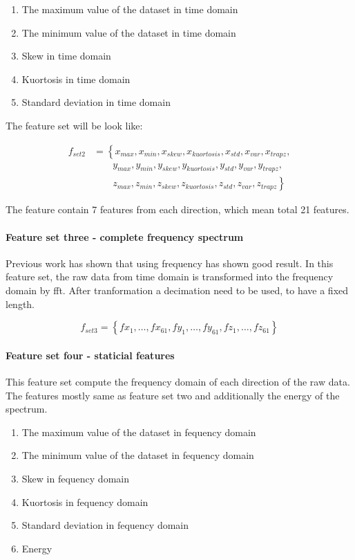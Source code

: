 \documentclass[USenglish]{ifimaster}  %
\begin{document}
\begin{enumerate}
\item The maximum value of the dataset in time domain
\item The minimum value of the dataset in time domain
\item Skew in time domain
\item Kuortosis in time domain 
\item Standard deviation in time domain
\end{enumerate}

The feature set will be look like:

\begin{align}
 f_{set2} &= \left\{ x_{max},x_{min},x_{skew},x_{kuortosis},x_{std},x_{var},x_{trapz}, \right.\nonumber\\
 &\qquad \left. {} y_{max},y_{min},y_{skew},y_{kuortosis},y_{std},y_{var},y_{trapz}, \right.\nonumber\\
 &\qquad \left. {} z_{max},z_{min},z_{skew},z_{kuortosis},z_{std},z_{var},z_{trapz} \right\}
\end{align}

The feature contain 7 features from each direction, which mean total 21 features. 

\paragraph{Feature set three - complete frequency spectrum} Previous work has shown that using frequency has shown good result. In this feature set, the raw data from time domain is transformed into the frequency domain by fft. After tranformation a decimation need to be used, to have a fixed length. 

\begin{equation} \label{eq:f2}
f_{set3}= \left\{ fx_1,\dotsc,fx_{61},fy_1, \dotsc,fy_{61},fz_1,\dotsc,fz_{61} \right\}
\end{equation}


\paragraph{Feature set four - staticial features} This feature set compute the frequency domain of each direction of the raw data. The features mostly same as feature set two and additionally the energy of the spectrum.

\begin{enumerate}
\item The maximum value of the dataset in fequency domain
\item The minimum value of the dataset in fequency domain
\item Skew in fequency domain
\item Kuortosis in fequency domain 
\item Standard deviation in fequency domain
\item Energy 
\end{enumerate}
\end{document}
